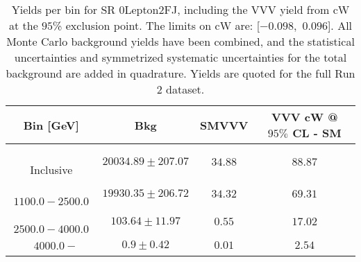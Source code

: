 \begin{table}[!htbp]
    \small
    \center
    \begin{tabular}{c||c|c|c}
    Bin [GeV] & Bkg & SMVVV & \pbox{20cm}{VVV \\ cW @ $95\%$ CL - SM \\ }\\
    \hline
    \pbox{20cm}{ ~ \\Inclusive\\ } & $20034.89 \pm 207.07$ & $34.88$ & $88.87$\\
    \hline
    \pbox{20cm}{ ~ \\$1100.0-2500.0$\\ } & $19930.35 \pm 206.72$ & $34.32$ & $69.31$\\
    \hline
    \pbox{20cm}{ ~ \\$2500.0-4000.0$\\ } & $103.64 \pm 11.97$ & $0.55$ & $17.02$\\
    \hline
    \pbox{20cm}{ ~ \\$4000.0-$\\ } & $0.9 \pm 0.42$ & $0.01$ & $2.54$\\
\end{tabular}
    \caption{Yields per bin for SR 0Lepton2FJ, including the VVV yield from cW at the $95$\% exclusion point. The limits on cW are: [$-0.098$,~$0.096$]. All Monte Carlo background yields have been combined, and the statistical uncertainties and symmetrized systematic uncertainties for the total background are added in quadrature. Yields are quoted for the full Run 2 dataset.}
    \label{tab:0Lepton2FJ$binssignal}
\end{table}
